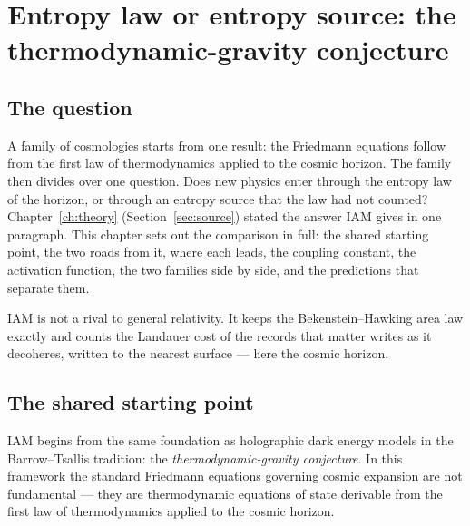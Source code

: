 \chapter{Entropy law or entropy source: the thermodynamic-gravity conjecture}\label{ch:entropicgravity}

\section*{The question}
A family of cosmologies starts from one result: the Friedmann equations follow from the first law of thermodynamics applied to the cosmic horizon. The
family then divides over one question. Does new physics enter through the entropy law of the horizon, or through an entropy source that the law had not
counted? Chapter~\ref{ch:theory} (Section~\ref{sec:source}) stated the answer IAM gives in one paragraph. This chapter sets out the comparison in full: the
shared starting point, the two roads from it, where each leads, the coupling constant, the activation function, the two families side by side, and the
predictions that separate them.

IAM is not a rival to general relativity. It keeps the Bekenstein--Hawking area law exactly and counts the Landauer cost of the records that matter
writes as it decoheres, written to the nearest surface --- here the cosmic horizon.

\section{The shared starting point}\label{sec:eg_start}
IAM begins from the same foundation as holographic dark energy models in the Barrow--Tsallis tradition: the \emph{thermodynamic-gravity conjecture}. In this
framework the standard Friedmann equations governing cosmic expansion are not fundamental --- they are thermodynamic equations of state derivable from the
first law of thermodynamics applied to the cosmic horizon. \interp

